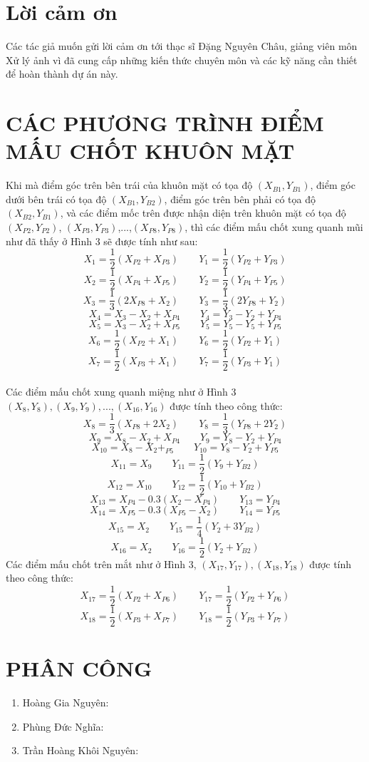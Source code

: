 \documentclass[journal]{IEEEtran}
\begin{document}
\section*{Lời cảm ơn}
Các tác giả muốn gửi lời cảm ơn tới thạc sĩ Đặng Nguyên Châu, giảng viên môn Xử lý ảnh vì đã cung cấp những kiến thức chuyên môn và các kỹ năng cần thiết để hoàn thành dự án này.




\newpage
\appendices
\section{CÁC PHƯƠNG TRÌNH ĐIỂM MẤU CHỐT KHUÔN MẶT}
Khi mà điểm góc trên bên trái của khuôn mặt có tọa độ $(X_{B1},Y_{B1})$, điểm góc dưới bên trái có tọa độ $(X_{B1},Y_{B2})$, điểm góc trên bên phải có tọa độ $(X_{B2},Y_{B1})$, và các điểm mốc trên được nhận diện trên khuôn mặt có tọa độ $(X_{P2},Y_{P2})$, $(X_{P3},Y_{P3})$,...,$(X_{P8},Y_{P8})$, thì các điểm mấu chốt xung quanh mũi như đã thấy ở Hình 3 sẽ được tính như sau:
\[X_{1}=\dfrac{1}{2}(X_{P2}+X_{P3}) \qquad Y_{1}=\dfrac{1}{2}(Y_{P2}+Y_{P3})\]
\[X_{2}=\dfrac{1}{2}(X_{P4}+X_{P5}) \qquad Y_{2}=\dfrac{1}{2}(Y_{P4}+Y_{P5})\]
\[X_{3}=\dfrac{1}{3}(2X_{P8}+X_{2}) \qquad Y_{3}=\dfrac{1}{3}(2Y_{P8}+Y_{2})\]
\[X_4 = X_3-X_2+X_{P4} \qquad Y_4 = Y_3-Y_2+Y_{P4}\]
\[X_5 = X_3-X_2+X_{P5} \qquad Y_5 = Y_5-Y_5+Y_{P5}\]
\[X_{6}=\dfrac{1}{2}(X_{P2}+X_{1}) \qquad Y_{6}=\dfrac{1}{2}(Y_{P2}+Y_{1})\]
\[X_{7}=\dfrac{1}{2}(X_{P3}+X_{1}) \qquad Y_{7}=\dfrac{1}{2}(Y_{P3}+Y_{1})\]
\\
Các điểm mấu chốt xung quanh miệng như ở Hình 3 $(X_8,Y_8),(X_9,Y_9),...,(X_{16},Y_{16})$ được tính theo công thức:
\[X_8=\dfrac{1}{3}(X_{P8}+2X_2) \qquad Y_8=\dfrac{1}{3}(Y_{P8}+2Y_2)\]
\[X_9=X_8-X_2+X_{P4} \qquad Y_9 = Y_8-Y_2+Y_{P4}\]
\[X_{10}=X_8-X_2+_{P5} \qquad Y_{10}=Y_8-Y_2+Y_{P5}\]
\[X_{11}=X_9 \qquad Y_{11} = \frac{1}{2}(Y_9+Y_{B2})\]
\[X_{12}=X_{10} \qquad Y_{12} = \frac{1}{2}(Y_{10}+Y_{B2})\]
\[X_{13}=X_{P4}-0.3(X_2-X_{P4}) \qquad Y_{13} = Y_{P4}\]
\[X_{14}=X_{P5}-0.3(X_{P5}-X_2) \qquad Y_{14} = Y_{P5}\]
\[X_{15}=X_{2} \qquad Y_{15} = \frac{1}{4}(Y_{2}+3Y_{B2})\]
\[X_{16}=X_{2} \qquad Y_{16} = \frac{1}{2}(Y_{2}+Y_{B2})\]
Các điểm mấu chốt trên mắt như ở Hình 3, $(X_{17},Y_{17}),(X_{18},Y_{18})$ được tính theo công thức:
\[X_{17}=\dfrac{1}{2}(X_{P2}+X_{P6}) \qquad Y_{17}=\dfrac{1}{2}(Y_{P2}+Y_{P6})\]
\[X_{18}=\dfrac{1}{2}(X_{P3}+X_{P7}) \qquad Y_{18}=\dfrac{1}{2}(Y_{P3}+Y_{P7})\]
\section{PHÂN CÔNG}
\begin{enumerate}
	\item Hoàng Gia Nguyên:
	\item Phùng Đức Nghĩa:
	\item Trần Hoàng Khôi Nguyên:
\end{enumerate}
\end{document}
